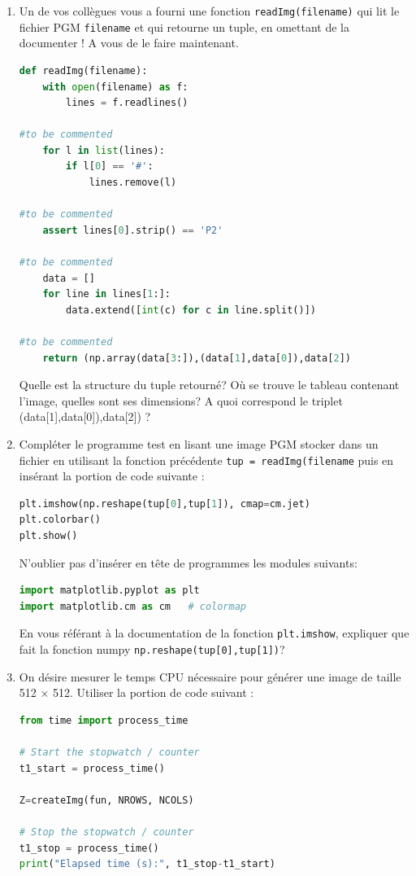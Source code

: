 \documentclass[a4paper, 10pt]{article}
\begin{document}
\begin{enumerate}

\item Un de vos collègues vous a fourni une fonction {\tt readImg(filename)}
qui lit  le fichier PGM {\tt filename}
et qui retourne un tuple, en omettant de la documenter ! A vous de le faire
maintenant.

\begin{lstlisting}[language=python]
def readImg(filename):
    with open(filename) as f:
        lines = f.readlines()

#to be commented
    for l in list(lines):
        if l[0] == '#':
            lines.remove(l)    

#to be commented
    assert lines[0].strip() == 'P2' 

#to be commented
    data = []
    for line in lines[1:]:
        data.extend([int(c) for c in line.split()])

#to be commented
    return (np.array(data[3:]),(data[1],data[0]),data[2])
\end{lstlisting}

Quelle est la structure du tuple retourné? Où se trouve le tableau
contenant l'image, quelles sont ses dimensions?
A quoi correspond le triplet (data[1],data[0]),data[2]) ?

\item Compléter le programme test en lisant une image PGM stocker dans un fichier
en utilisant  la fonction précédente {\tt tup = readImg(filename} puis
en insérant la portion de code suivante :
\begin{lstlisting}[language=python]
plt.imshow(np.reshape(tup[0],tup[1]), cmap=cm.jet) 
plt.colorbar()
plt.show()
\end{lstlisting}
N'oublier pas d'insérer en tête de programmes les modules suivants:
\begin{lstlisting}[language=python]
import matplotlib.pyplot as plt
import matplotlib.cm as cm   # colormap
\end{lstlisting}

En vous référant à la documentation de la fonction {\tt plt.imshow},
expliquer que fait la fonction numpy {\tt np.reshape(tup[0],tup[1])}?

\item On désire mesurer le temps CPU nécessaire pour générer une image
de taille 512 $\times$ 512. Utiliser la portion de code suivant :
\begin{lstlisting}[language=python]
from time import process_time

# Start the stopwatch / counter 
t1_start = process_time() 
   
Z=createImg(fun, NROWS, NCOLS)
  
# Stop the stopwatch / counter
t1_stop = process_time()
print("Elapsed time (s):", t1_stop-t1_start) 
\end{lstlisting}

\end{enumerate} 
\end{document}
